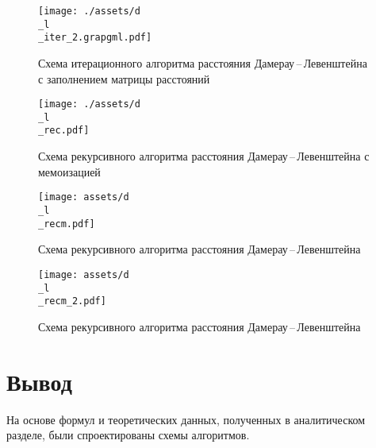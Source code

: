 \begin{figure}[ht!]
	\begin{center}
		\texttt{[image: ./assets/d\\\_l\\\_iter\_2.grapgml.pdf]}
	\end{center}
	
	\caption{Схема итерационного алгоритма расстояния Дамерау\,--\,Левенштейна с заполнением матрицы расстояний}
	\label{fig:damerau-Page-2}
\end{figure}

\begin{figure}[ht!]
	\begin{center}
		\texttt{[image: ./assets/d\\\_l\\\_rec.pdf]}
	\end{center}
	
	\caption{Схема рекурсивного алгоритма расстояния Дамерау\,--\,Левенштейна с мемоизацией}
	\label{fig:damerau-mem}
\end{figure}

\begin{figure}[ht!]
	\begin{center}
		\texttt{[image: assets/d\\\_l\\\_recm.pdf]}
	\end{center}
	
	\caption{Схема рекурсивного алгоритма расстояния Дамерау\,--\,Левенштейна}
	\label{fig:damerau-rec}
\end{figure}

\begin{figure}[ht!]
	\begin{center}
		\texttt{[image: assets/d\\\_l\\\_recm\_2.pdf]}
	\end{center}
	
	\caption{Схема рекурсивного алгоритма расстояния Дамерау\,--\,Левенштейна}
	\label{fig:damerau-rec-Page-2}
\end{figure}



\section{Вывод}
На основе формул и теоретических данных, полученных в аналитическом разделе, были спроектированы схемы алгоритмов.